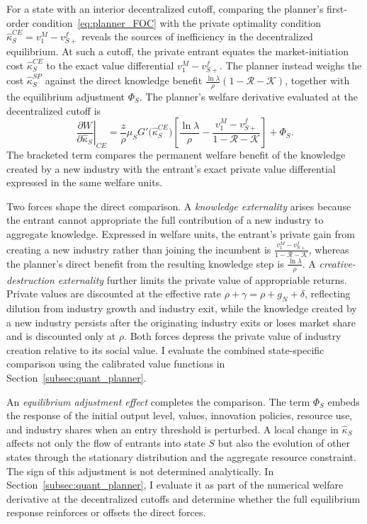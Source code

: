 \documentclass[12pt]{article}
\begin{document}
For a state with an interior decentralized cutoff, comparing the planner's first-order condition~\eqref{eq:planner_FOC} with the private optimality condition \(\hat\kappa^{CE}_S=v^M_1-v^f_{S+}\) reveals the sources of inefficiency in the decentralized equilibrium. At such a cutoff, the private entrant equates the market-initiation cost \(\hat{\kappa}^{CE}_S\) to the exact value differential \(v^M_1-v^f_{S+}\). The planner instead weighs the cost \(\hat{\kappa}^{SP}_S\) against the direct knowledge benefit \(\frac{\ln\lambda}{\rho}(1-\mathcal{R}-\mathcal{K})\), together with the equilibrium adjustment \(\Phi_S\). The planner's welfare derivative evaluated at the decentralized cutoff is
\[\left.\frac{\partial W}{\partial\hat\kappa_S}\right|_{CE}
=\frac{z}{\rho}\mu_SG'\bigl(\hat\kappa^{CE}_S\bigr)
\left[\frac{\ln\lambda}{\rho}-\frac{v^M_1-v^f_{S+}}{1-\mathcal{R}-\mathcal{K}}\right]+\Phi_S.\]
The bracketed term compares the permanent welfare benefit of the knowledge created by a new industry with the entrant's exact private value differential expressed in the same welfare units.

Two forces shape the direct comparison. A \emph{knowledge externality} arises because the entrant cannot appropriate the full contribution of a new industry to aggregate knowledge. Expressed in welfare units, the entrant's private gain from creating a new industry rather than joining the incumbent is \(\frac{v^M_1-v^f_{S+}}{1-\mathcal{R}-\mathcal{K}}\), whereas the planner's direct benefit from the resulting knowledge step is \(\frac{\ln\lambda}{\rho}\). A \emph{creative-destruction externality} further limits the private value of appropriable returns. Private values are discounted at the effective rate \(\rho+\gamma=\rho+g_N+\delta\), reflecting dilution from industry growth and industry exit, while the knowledge created by a new industry persists after the originating industry exits or loses market share and is discounted only at \(\rho\). Both forces depress the private value of industry creation relative to its social value. I evaluate the combined state-specific comparison using the calibrated value functions in Section~\ref{subsec:quant_planner}.

An \emph{equilibrium adjustment effect} completes the comparison. The term \(\Phi_S\) embeds the response of the initial output level, values, innovation policies, resource use, and industry shares when an entry threshold is perturbed. A local change in \(\hat\kappa_S\) affects not only the flow of entrants into state \(S\) but also the evolution of other states through the stationary distribution and the aggregate resource constraint. The sign of this adjustment is not determined analytically. In Section~\ref{subsec:quant_planner}, I evaluate it as part of the numerical welfare derivative at the decentralized cutoffs and determine whether the full equilibrium response reinforces or offsets the direct forces.
\end{document}

